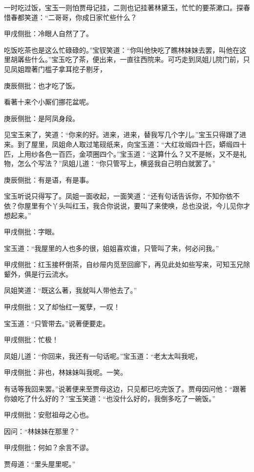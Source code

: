 \begin{parag}
    一时吃过饭，宝玉一则怕贾母记挂，二则也记挂著林黛玉，忙忙的要茶漱口。探春惜春都笑道：“二哥哥，你成日家忙些什么？\begin{note}甲戌侧批：冷眼人自然了了。\end{note}吃饭吃茶也是这么忙碌碌的。”宝钗笑道：“你叫他快吃了瞧林妹妹去罢，叫他在这里胡羼些什么。”宝玉吃了茶，便出来，一直往西院来。可巧走到凤姐儿院门前，只见凤姐蹬著门槛子拿耳挖子剔牙，\begin{note}庚辰侧批：也才吃了饭。\end{note}看著十来个小厮们挪花盆呢。\begin{note}庚辰侧批：是阿凤身段。\end{note}见宝玉来了，笑道：“你来的好。进来，进来，替我写几个字儿。”宝玉只得跟了进来。到了屋里，凤姐命人取过笔砚纸来，向宝玉道：“大红妆缎四十匹，蟒缎四十匹，上用纱各色一百匹，金项圈四个。”宝玉道：“这算什么？又不是帐，又不是礼物，怎么个写法？”凤姐儿道：“你只管写上，横竖我自己明白就罢了。”\begin{note}庚辰侧批：有是语，有是事。\end{note}宝玉听说只得写了。凤姐一面收起，一面笑道：“还有句话告诉你，不知你依不依？你屋里有个丫头叫红玉，我合你说说，要叫了来使唤，总也没说，今儿见你才想起来。”\begin{note}甲戌侧批：字眼。\end{note}宝玉道：“我屋里的人也多的很，姐姐喜欢谁，只管叫了来，何必问我。”\begin{note}甲戌侧批：红玉接杯倒茶，自纱屉内觅至回廊下，再见此处如些写来，可知玉兄除颦外，俱是行云流水。\end{note}凤姐笑道：“既这么著，我就叫人带他去了。”\begin{note}甲戌侧批：又了却怡红一冤孽，一叹！\end{note}宝玉道：“只管带去。”说著便要走。\begin{note}甲戌侧批：忙极！\end{note}凤姐儿道：“你回来，我还有一句话呢。”宝玉道：“老太太叫我呢，\begin{note}甲戌侧批：非也，林妹妹叫我呢。一笑。\end{note}有话等我回来罢。”说著便来至贾母这边，只见都已吃完饭了。贾母因问他：“跟著你娘吃了什么好的？”宝玉笑道：“也没什么好的，我倒多吃了一碗饭。”\begin{note}甲戌侧批：安慰祖母之心也。\end{note}因问：“林妹妹在那里？”\begin{note}甲戌侧批：何如？余言不谬。\end{note}贾母道：“里头屋里呢。”
\end{parag}


